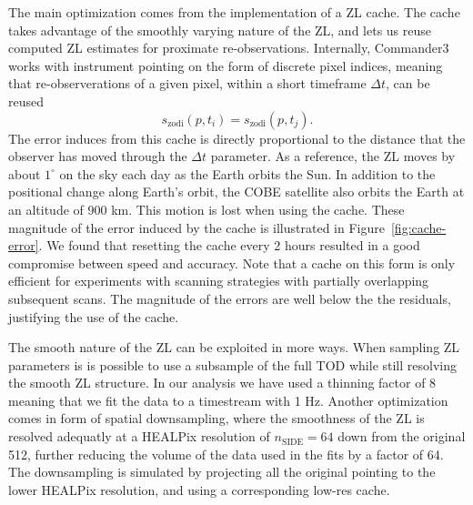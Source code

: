 \documentclass[twocolumn]{aa}
\begin{document}
The main optimization comes from the implementation of a ZL cache. The 
cache takes advantage of the smoothly varying nature of the ZL, and lets 
us reuse computed ZL estimates for proximate re-observations. 
Internally, Commander3 works with instrument pointing on the form of 
discrete pixel indices, meaning that re-observerations of a given pixel, 
within a short timeframe $\Delta t$, can be reused
\begin{equation}
    s_\mathrm{zodi}(p, t_i) = s_\mathrm{zodi}(p, t_j).
\end{equation}
The error induces from this cache is directly proportional to the 
distance that the observer has moved through the $\Delta t$ parameter. 
As a reference, the ZL moves by about $1^\circ$ on the sky each day as 
the Earth orbits the Sun. In addition to the positional change along 
Earth's orbit, the COBE satellite also orbits the Earth at an altitude 
of 900 km. This motion is lost when using the cache. These magnitude of 
the error induced by the cache is illustrated in 
Figure~\ref{fig:cache-error}.  We found that resetting the cache every 
2 hours resulted in a good compromise between speed and accuracy. Note 
that a cache on this form is only efficient for experiments with scanning 
strategies with partially overlapping subsequent scans. The magnitude of
the errors are well below the the residuals, justifying the use of the 
cache.

The smooth nature of the ZL can be exploited in more ways. When sampling 
ZL parameters is is possible to use a subsample of the full TOD while 
still resolving the smooth ZL structure. In our analysis we have used a 
thinning factor of 8 meaning that we fit the data to a timestream with 1 
Hz. Another optimization comes in form of spatial downsampling, where 
the smoothness of the ZL is resolved adequatly at a HEALPix resolution 
of $n_\mathrm{SIDE} = 64$ down from the original 512, further reducing 
the volume of the data used in the fits by a factor of 64. The 
downsampling is simulated by projecting all the original pointing to the 
lower HEALPix resolution, and using a corresponding low-res cache.
\end{document}
